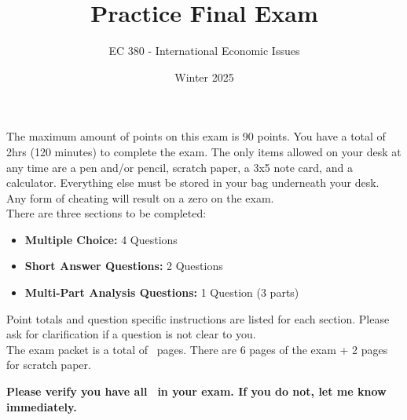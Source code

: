 \documentclass[12pt]{exam}
\title{Practice Final Exam}
\author{EC 380 - International Economic Issues}
\date{Winter 2025}
\begin{document}
\begin{coverpages}

\maketitle

\begin{center}
\end{center}
\vspace{2cm}

\vspace{1cm}
\noindent
The maximum amount of points on this exam is 90 points. 
You have a total of 2hrs (120 minutes) to complete the exam. 
The only items allowed on your desk at any time are a pen and/or pencil, scratch paper, a 3x5 note card, and a calculator. 
Everything else must be stored in your bag underneath your desk. 
Any form of cheating will result on a zero on the exam.\\

\noindent There are three sections to be completed:

\begin{itemize}
    \item \textbf{Multiple Choice:} 4 Questions
    \item \textbf{Short Answer Questions:} 2 Questions
    \item \textbf{Multi-Part Analysis Questions:} 1 Question (3 parts)
\end{itemize}

\noindent Point totals and question specific instructions are listed for each section.
Please ask for clarification if a question is not clear to you.\\

\noindent The exam packet is a total of \numpages $\,$ pages.
There are 6 pages of the exam + 2 pages for scratch paper.

\noindent \textbf{Please verify you have all \numpages $\,$ in your exam. If you do not, let me know immediately.}

\noindent 

\end{coverpages}
\end{document}

